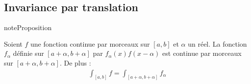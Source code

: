 \documentclass[letterpaper,10pt,french]{sphinxmanual}
\begin{document}
\subsection{Invariance par translation}
\label{\detokenize{pptint:invariance-par-translation}}
\begin{sphinxadmonition}{note}{Proposition}

\sphinxAtStartPar
Soient \(f\) une fonction continue par morceaux sur \([a, b]\) et \(\alpha\) un réel.
La fonction \(f_\alpha\) définie sur \([a+\alpha, b+\alpha]\) par \(f_\alpha(x)f(x-\alpha)\) est continue par morceaux sur \([a+\alpha, b+\alpha]\). De plus :
\begin{equation*}
\begin{split}
\int_{[a, b]}f= \int_{[a+\alpha, b+\alpha]} f_{\alpha}
\end{split}
\end{equation*}\end{sphinxadmonition}
\end{document}
